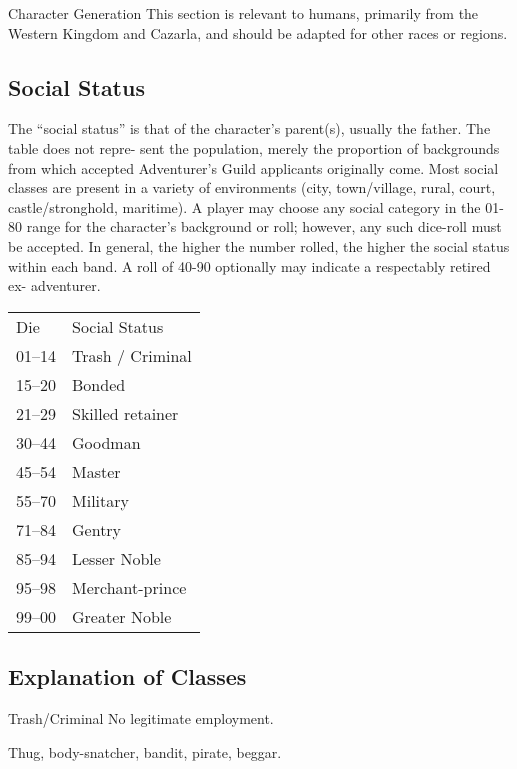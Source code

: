 \begin{Chapter}{Character Generation}
This section is relevant to humans, primarily from the Western Kingdom
and Cazarla, and should be adapted for other races or regions.

\subsection{Social Status}

The “social status” is that of the character’s parent(s), usually the
father. The table does not repre- sent the population, merely the
proportion of backgrounds from which accepted Adventurer’s Guild
applicants originally come. Most social classes are present in a
variety of environments (city, town/village, rural, court,
castle/stronghold, maritime). A player may choose any social category
in the 01-80 range for the character’s background or roll; however,
any such dice-roll must be accepted.  In general, the higher the
number rolled, the higher the social status within each band. A roll
of 40-90 optionally may indicate a respectably retired ex- adventurer.

\begin{tabularx}{\columnwidth}{lX}
Die	& Social Status \\
01–14	& Trash / Criminal \\
15–20	& Bonded \\
21–29	& Skilled retainer \\
30–44	& Goodman \\
45–54	& Master \\
55–70	& Military \\
71–84	& Gentry \\
85–94	& Lesser Noble \\
95–98	& Merchant-prince \\ 
99–00	& Greater Noble \\
\end{tabularx}

\subsection{Explanation of Classes}

\begin{Description}

\item[Trash/Criminal] No legitimate employment. 

  \begin{example}
    Thug, body-snatcher, bandit, pirate, beggar.
  \end{example}


\end{Description}
\end{Chapter}
